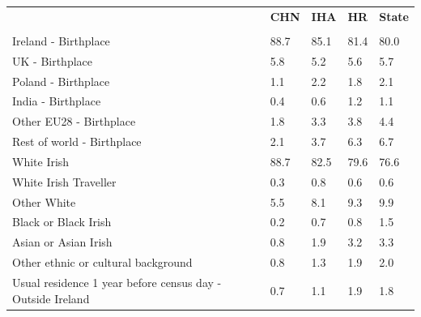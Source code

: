 \documentclass{article}
\begin{document}
\pagebreak
\begin{table}[h]	
\centering
		\begin{tabular}{KTTTT}
  \hline
& \textbf{CHN} & \textbf{IHA} & \textbf{HR}& \textbf{State}\\ 
  \hline
    \\ 
    \hline
Ireland - Birthplace & 88.7& 85.1& 81.4& 80.0\\
UK - Birthplace & 5.8& 5.2& 5.6& 5.7\\
Poland - Birthplace & 1.1& 2.2& 1.8& 2.1\\
India - Birthplace & 0.4& 0.6& 1.2& 1.1\\
Other EU28 - Birthplace & 1.8& 3.3& 3.8& 4.4\\
Rest of world - Birthplace & 2.1& 3.7& 6.3& 6.7\\
    \hline
White Irish & 88.7& 82.5& 79.6& 76.6\\
White Irish Traveller & 0.3& 0.8& 0.6& 0.6\\
Other White & 5.5& 8.1& 9.3& 9.9\\
Black or Black Irish & 0.2& 0.7& 0.8& 1.5\\
Asian or Asian Irish & 0.8& 1.9& 3.2& 3.3\\
Other ethnic or cultural background & 0.8& 1.3& 1.9& 2.0\\
    \hline
Usual residence 1 year before census day - Outside Ireland & 0.7& 1.1& 1.9& 1.8\\


\end{tabular}
\end{table}
\end{document}

